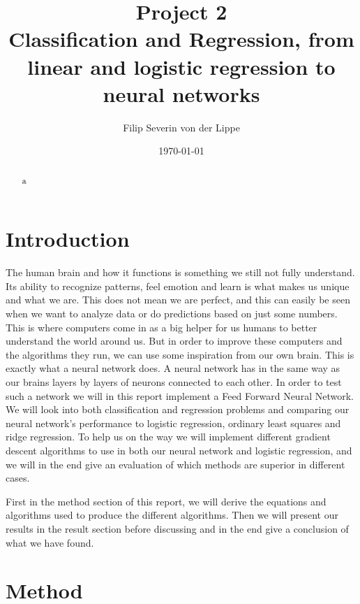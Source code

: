 \documentclass[11pt]{article}
\title{Project 2\\ Classification and Regression, from linear and logistic regression to neural networks}
\author{Filip Severin von der Lippe}
\date{\today}
\begin{document}
\maketitle
\begin{abstract}
    a
\end{abstract}
\newpage
\tableofcontents
\newpage
\section{Introduction}
The human brain and how it functions is something we still not fully understand. Its ability to recognize patterns, feel emotion and learn is what makes us unique and what we are. This does not mean we are perfect, and this can easily be seen when we want to analyze data or do predictions based on just some numbers. This is where computers come in as a big helper for us humans to better understand the world around us. But in order to improve these computers and the algorithms they run, we can use some inspiration from our own brain. This is exactly what a neural network does. A neural network has in the same way as our brains layers by layers of neurons connected to each other. In order to test such a network we will in this report implement a Feed Forward Neural Network. We will look into both classification and regression problems and comparing our neural network's performance to logistic regression, ordinary least squares and ridge regression. To help us on the way we will implement different gradient descent algorithms to use in both our neural network and logistic regression, and we will in the end give an evaluation of which methods are superior in different cases.

First in the method section of this report, we will derive the equations and algorithms used to produce the different algorithms. Then we will present our results in the result section before discussing and in the end give a conclusion of what we have found.
\section{Method}
\end{document}
